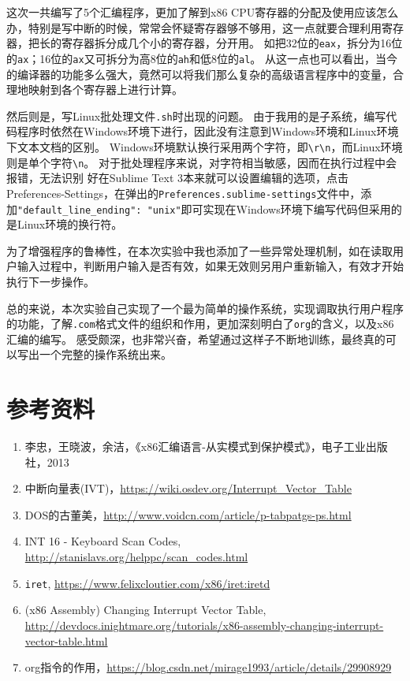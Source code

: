 \documentclass[logo,reportComp]{thesis}
\begin{document}
这次一共编写了5个汇编程序，更加了解到x86 CPU寄存器的分配及使用应该怎么办，特别是写中断的时候，常常会怀疑寄存器够不够用，这一点就要合理利用寄存器，把长的寄存器拆分成几个小的寄存器，分开用。
如把32位的\verb'eax'，拆分为16位的\verb'ax'；16位的\verb'ax'又可拆分为高8位的\verb'ah'和低8位的\verb'al'。
从这一点也可以看出，当今的编译器的功能多么强大，竟然可以将我们那么复杂的高级语言程序中的变量，合理地映射到各个寄存器上进行计算。

然后则是，写Linux批处理文件\verb'.sh'时出现的问题。
由于我用的是子系统，编写代码程序时依然在Windows环境下进行，因此没有注意到Windows环境和Linux环境下文本文档的区别。
Windows环境默认换行采用两个字符，即\verb'\r\n'，而Linux环境则是单个字符\verb'\n'。
对于批处理程序来说，对字符相当敏感，因而在执行过程中会报错，无法识别
好在Sublime Text 3本来就可以设置编辑的选项，点击Preferences-Settings，在弹出的\verb'Preferences.sublime-settings'文件中，添加\verb'"default_line_ending": "unix"'即可实现在Windows环境下编写代码但采用的是Linux环境的换行符。

为了增强程序的鲁棒性，在本次实验中我也添加了一些异常处理机制，如在读取用户输入过程中，判断用户输入是否有效，如果无效则另用户重新输入，有效才开始执行下一步操作。

总的来说，本次实验自己实现了一个最为简单的操作系统，实现调取执行用户程序的功能，了解\verb'.com'格式文件的组织和作用，更加深刻明白了\verb'org'的含义，以及x86汇编的编写。
感受颇深，也非常兴奋，希望通过这样子不断地训练，最终真的可以写出一个完整的操作系统出来。

\section{参考资料}
\begin{enumerate}
	\item 李忠，王晓波，余洁，《x86汇编语言-从实模式到保护模式》，电子工业出版社，2013
	\item 中断向量表(IVT)，\url{https://wiki.osdev.org/Interrupt_Vector_Table}
	\item DOS的古董美，\url{http://www.voidcn.com/article/p-tabpatgs-ps.html}
	\item INT 16 - Keyboard Scan Codes, \url{http://stanislavs.org/helppc/scan_codes.html}
	\item \verb'iret', \url{https://www.felixcloutier.com/x86/iret:iretd}
	\item (x86 Assembly) Changing Interrupt Vector Table, \url{http://devdocs.inightmare.org/tutorials/x86-assembly-changing-interrupt-vector-table.html}
    \item org指令的作用，\url{https://blog.csdn.net/mirage1993/article/details/29908929}
\end{enumerate}
\end{document}
